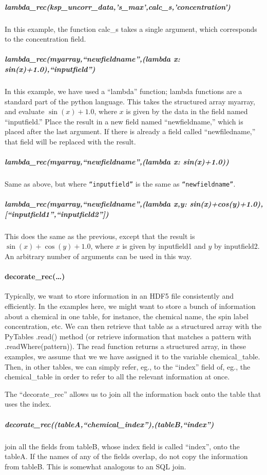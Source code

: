 \subparagraph{lambda_rec(ksp_uncorr_data,'s_{max}',calc\_s,'concentration')}
In this example, the function calc\_s takes a single argument, which corresponds to the concentration field.
\subparagraph{lambda\_rec(myarray,``newfieldname'',(lambda x: sin(x)+1.0),``inputfield'')}
In this example, we have used a ``lambda'' function;
    lambda functions are a standard part of the python language.
This takes the structured array myarray,
    and evaluate $\sin(x)+1.0$, where $x$ is given
    by the data in the field named ``inputfield.''
Place the result in a new field named ``newfieldname,''
    which is placed after the last argument.
If there is already a field called ``newfiledname,''
    that field will be replaced with the result.

\subparagraph{lambda\_rec(myarray,``newfieldname'',(lambda x: sin(x)+1.0))}
Same as above, but where \texttt{``inputfield''} is the same as \texttt{``newfieldname''}.
\subparagraph{lambda\_rec(myarray,``newfieldname'',(lambda x,y: sin(x)+cos(y)+1.0),[``inputfield1'',``inputfield2''])}
This does the same as the previous, except that
    the result is $\sin(x)+\cos(y)+1.0$, where
    $x$ is given by inputfield1 and $y$ by inputfield2.
An arbitrary number of arguments can be used in this way.
\paragraph{decorate\_rec(\ldots)}
Typically, we want to store information in an HDF5 file consistently
    and efficiently.
In the examples here,
    we might want to store a bunch of information about a chemical
    in one table, for instance, the chemical name, the spin label
    concentration, etc.
We can then retrieve that table as a structured array
    with the PyTables .read() method
    (or retrieve information that matches a pattern with .readWhere(pattern)).
The read function returns a structured array,
    in these examples, we assume that we we have assigned it
    to the variable chemical\_table.
Then, in other tables,
    we can simply refer, eg., to the ``index'' field of, eg., the chemical\_table 
    in order to refer to all the relevant information at once.

The ``decorate\_rec'' allows us to join all the information back onto the table
    that uses the index.

\subparagraph{decorate\_rec((tableA,``chemical\_index''),(tableB,``index'')}
join all the fields from tableB, whose index field is called ``index'',
    onto the tableA.
If the names of any of the fields overlap, do not copy the information from
    tableB.
This is somewhat analogous to an SQL join.

